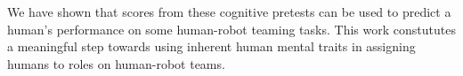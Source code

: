 \documentclass[letterpaper, 10 pt, conference]{ieeeconf}  %
\begin{document}
We have shown that scores from these cognitive pretests can be used to predict a human's performance on some human-robot teaming tasks. This work constututes a meaningful step towards using inherent human mental traits in assigning humans to roles on human-robot teams.



\addtolength{\textheight}{-12cm}   %














\end{document}
